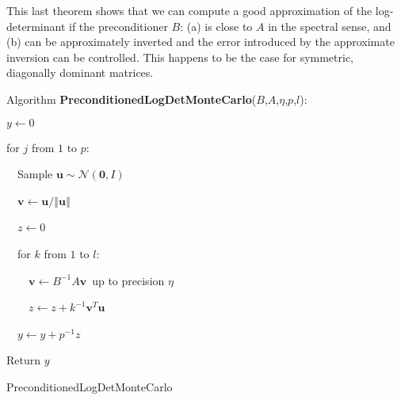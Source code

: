 This last theorem shows that we can compute a good approximation of
the log-determinant if the preconditioner $B$: (a) is close to $A$
in the spectral sense, and (b) can be approximately inverted and the
error introduced by the approximate inversion can be controlled. This
happens to be the case for symmetric, diagonally dominant matrices.

\begin{algorithm}
Algorithm \textbf{PreconditionedLogDetMonteCarlo}($B$,$A$,$\eta$,$p$,$l$):

$y\leftarrow0$

for $j$ from $1$ to $p$:

~~Sample $\mathbf{u}\sim\mathcal{N}\left(\mathbf{0},I\right)$

~~$\mathbf{v}\leftarrow\mathbf{u}/\left\Vert \mathbf{u}\right\Vert $

~~$z\leftarrow0$

~~for $k$ from $1$ to $l$:

~~~~$\mathbf{v}\leftarrow B^{-1}A\mathbf{v}$~up to precision
$\eta$

~~~~$z\leftarrow z+k^{-1}\mathbf{v}^{T}\mathbf{u}$

~~$y\leftarrow y+p^{-1}z$

Return $y$

\caption{PreconditionedLogDetMonteCarlo\label{alg:SampleLogDet}}
\end{algorithm}

